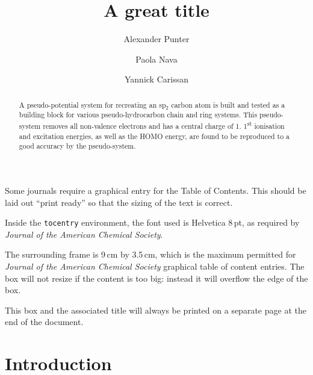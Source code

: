 \documentclass[journal=jctcce,manuscript=article]{achemso}
\author{Alexander Punter}
\author{Paola Nava}
\author{Yannick Carissan}
\affiliation[Aix-Marseille University]
{Aix Marseille Univ, CNRS, Centrale Marseille, iSm2, Marseille, France}
\title[A great title]
  {A great title}
\begin{document}
\begin{tocentry}

Some journals require a graphical entry for the Table of Contents.
This should be laid out ``print ready'' so that the sizing of the
text is correct.

Inside the \texttt{tocentry} environment, the font used is Helvetica
8\,pt, as required by \emph{Journal of the American Chemical
Society}.

The surrounding frame is 9\,cm by 3.5\,cm, which is the maximum
permitted for  \emph{Journal of the American Chemical Society}
graphical table of content entries. The box will not resize if the
content is too big: instead it will overflow the edge of the box.

This box and the associated title will always be printed on a
separate page at the end of the document.

\end{tocentry}

\begin{abstract}
A pseudo-potential system for recreating an sp\(_{2}\) carbon atom is built and tested as a building block for various pseudo-hydrocarbon chain and ring systems.  This pseudo-system removes all non-valence electrons and has a central charge of 1. 1\textsuperscript{st} ionisation and excitation energies, as well as the HOMO energy, are found to be reproduced to a good accuracy by the pseudo-system.
\end{abstract}

\section{Introduction}
\end{document}
